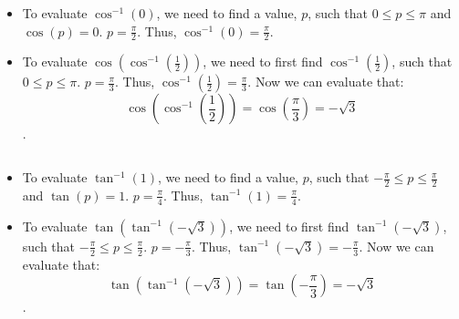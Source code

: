 \begin{solution}
	\label{sol:evaluate_invs_cos}$ $

	\begin{itemize}
		\item To evaluate $\cos^{-1} (0)$, we need to find a value, $p$, such that
		      $0 \le p \le \pi$ and $\cos (p) = 0$. $p = \frac{\pi}{2}$. Thus,
		      $\cos^{-1} (0) = \frac{\pi}{2}$.
		\item To evaluate $\cos (\cos^{-1} (\frac{1}{2}))$, we need to first find
		      $\cos^{-1} (\frac{1}{2})$, such that $0 \le p \le \pi$. $p =
			      \frac{\pi}{3}$. Thus, $\cos^{-1} (\frac{1}{2}) = \frac{\pi}{3}$. Now we
		      can evaluate that:
		      \[
			      \cos \left(\cos^{-1} \left(\frac{1}{2}\right)\right) = \cos
			      \left(\frac{\pi}{3}\right) = -\sqrt{3}
		      \].
	\end{itemize}
\end{solution}

\begin{solution}
	\label{sol:evaluate_invs_tan}$ $
	\begin{itemize}
		\item To evaluate $\tan^{-1} (1)$, we need to find a value, $p$, such that
		      $-\frac{\pi}{2} \le p \le \frac{\pi}{2}$ and $\tan (p) = 1$. $p =
			      \frac{\pi}{4}$. Thus, $\tan^{-1} (1) = \frac{\pi}{4}$.
		\item To evaluate $\tan (\tan^{-1} (-\sqrt{3}))$, we need to first find
		      $\tan^{-1} (-\sqrt{3})$, such that $-\frac{\pi}{2} \le p \le
			      \frac{\pi}{2}$. $p = -\frac{\pi}{3}$. Thus, $\tan^{-1} (-\sqrt{3}) =
			      -\frac{\pi}{3}$. Now we can evaluate that:
		      \[
			      \tan \left(\tan^{-1} \left(-\sqrt{3}\right)\right) = \tan
			      \left(-\frac{\pi}{3}\right) = -\sqrt{3}
		      \].
	\end{itemize}

\end{solution}

